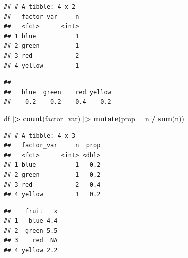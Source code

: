 \documentclass[
  12pt,
  oneside]{book}
\newenvironment{Shaded}{\begin{snugshade}}{\end{snugshade}}
\newcommand{\AttributeTok}[1]{\textcolor[rgb]{0.13,0.29,0.53}{#1}}
\newcommand{\CommentTok}[1]{\textcolor[rgb]{0.56,0.35,0.01}{\textit{#1}}}
\newcommand{\ConstantTok}[1]{\textcolor[rgb]{0.56,0.35,0.01}{#1}}
\newcommand{\FunctionTok}[1]{\textcolor[rgb]{0.13,0.29,0.53}{\textbf{#1}}}
\newcommand{\NormalTok}[1]{#1}
\newcommand{\SpecialCharTok}[1]{\textcolor[rgb]{0.81,0.36,0.00}{\textbf{#1}}}
\begin{document}
\begin{verbatim}
## # A tibble: 4 x 2
##   factor_var     n
##   <fct>      <int>
## 1 blue           1
## 2 green          1
## 3 red            2
## 4 yellow         1
\end{verbatim}

\begin{Shaded}
\end{Shaded}

\begin{verbatim}
## 
##   blue  green    red yellow 
##    0.2    0.2    0.4    0.2
\end{verbatim}

\begin{Shaded}
\begin{Highlighting}[]
\NormalTok{df }\SpecialCharTok{|\textgreater{}} 
  \FunctionTok{count}\NormalTok{(factor\_var) }\SpecialCharTok{|\textgreater{}} 
  \FunctionTok{mutate}\NormalTok{(}\AttributeTok{prop =}\NormalTok{ n }\SpecialCharTok{/} \FunctionTok{sum}\NormalTok{(n))}
\end{Highlighting}
\end{Shaded}

\begin{verbatim}
## # A tibble: 4 x 3
##   factor_var     n  prop
##   <fct>      <int> <dbl>
## 1 blue           1   0.2
## 2 green          1   0.2
## 3 red            2   0.4
## 4 yellow         1   0.2
\end{verbatim}

\begin{Shaded}
\end{Shaded}

\begin{verbatim}
##    fruit   x
## 1   blue 4.4
## 2  green 5.5
## 3    red  NA
## 4 yellow 2.2
\end{verbatim}

\begin{Shaded}
\end{Shaded}
\end{document}
